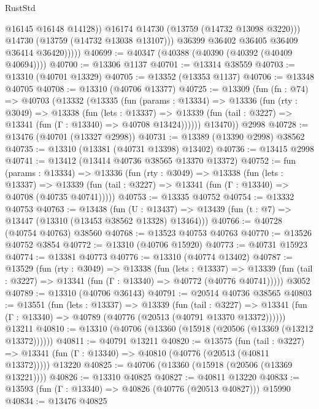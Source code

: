 \begin{lexlean}{RustStd}
\begin{coremodule}
                      @16145
                      @16148
                      @14128))
                  @16174
                  @14730
                  (@13759 (@14732 @13098 @3220)))
                @14730
                (@13759 (@14732 @13038 @13107)))
              @36399
              @36402
              @36405
              @36409
              @36414
              @36420)))))
@40699 := @40347 (@40388 (@40390 (@40392 (@40409 @40694))))
@40700 := @13306 @1137
@40701 := @13314 @38559
@40703 := @13310 (@40701 @13329)
@40705 := @13352 (@13353 @1137)
@40706 := @13348 @40705
@40708 := @13310 (@40706 @13377)
@40725 := @13309
    (fun (fn : @74) =>
    @40703
      (@13332
        (@13335
          (fun (params : @13334) =>
          @13336
            (fun (rty : @3049) =>
            @13338
              (fun (lets : @13337) =>
              @13339 (fun (tail : @3227) => @13341 (fun (Γ : @13340) => @40708 @13424))))))
        @13470))
    @2998
@40728 := @13476 (@40701 (@13327 @2998))
@40731 := @13389 (@13390 @2998) @38562
@40735 := @13310 (@13381 (@40731 @13398) @13402)
@40736 := @13415 @2998
@40741 := @13412 (@13414 @40736 @38565 @13370 @13372)
@40752 := fun (params : @13334) =>
  @13336
    (fun (rty : @3049) =>
    @13338
      (fun (lets : @13337) =>
      @13339 (fun (tail : @3227) => @13341 (fun (Γ : @13340) => @40708 (@40735 @40741)))))
@40753 := @13335 @40752
@40754 := @13332 @40753
@40763 := @13438
    (fun (U : @13437) => @13439 (fun (t : @7) => @13447 (@13310 (@13453 @38562 @13328) @13464)))
@40766 := @40728 (@40754 @40763) @38560
@40768 := @13523 @40753 @40763
@40770 := @13526 @40752 @3854
@40772 := @13310 (@40706 @15920)
@40773 := @40731 @15923
@40774 := @13381 @40773
@40776 := @13310 (@40774 @13402)
@40787 := @13529
    (fun (rty : @3049) =>
    @13338
      (fun (lets : @13337) =>
      @13339 (fun (tail : @3227) => @13341 (fun (Γ : @13340) => @40772 (@40776 @40741)))))
    @3052
@40789 := @13310 (@40706 @36143)
@40791 := @20514 @40736 @38565
@40803 := @13551
    (fun (lets : @13337) =>
    @13339
      (fun (tail : @3227) =>
      @13341 (fun (Γ : @13340) => @40789 (@40776 (@20513 (@40791 @13370 @13372))))))
    @13211
@40810 := @13310 (@40706 (@13360 (@15918 (@20506 (@13369 (@13212 @13372))))))
@40811 := @40791 @13211
@40820 := @13575
    (fun (tail : @3227) => @13341 (fun (Γ : @13340) => @40810 (@40776 (@20513 (@40811 @13372)))))
    @13220
@40825 := @40706 (@13360 (@15918 (@20506 (@13369 @13221))))
@40826 := @13310 @40825
@40827 := @40811 @13220
@40833 := @13593 (fun (Γ : @13340) => @40826 (@40776 (@20513 @40827))) @15990
@40834 := @13476 @40825

\end{coremodule}
\end{lexlean}
